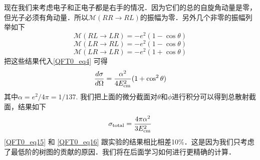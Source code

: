 现在我们来考虑电子和正电子都是右手的情况．因为它们的总的自旋角动量是零，但光子必须有角动量．所以$\mathcal M (RR \rightarrow RL)$的振幅为零．另外几个非零的振幅列举如下
\begin{equation}
\mathcal M(RL\rightarrow LR) = - e^2(1-\cos\theta)  
\end{equation}
\begin{equation}
\mathcal M(LR\rightarrow RL) = - e^2 (1-\cos\theta)
\end{equation}
\begin{equation}
\mathcal M(LR \rightarrow LR) = - e^2(1+\cos\theta)
\end{equation}
把这些结果代入\autoref{QFT0_eq4} 可得
\begin{equation}\label{QFT0_eq15}
\frac{d\sigma}{d\Omega}  = \frac{\alpha^2}{4E_{\rm cm}^2}(1+\cos^2\theta) 
\end{equation} 
其中$\alpha = e^2/4\pi=1/137$. 我们把上面的微分截面对$\theta$和$\phi$进行积分可以得到总散射截面，结果如下
\begin{equation}\label{QFT0_eq16}
\sigma_{\rm total} = \frac{4\pi \alpha^2}{3E_{\rm cm}^2}
\end{equation}
\autoref{QFT0_eq15} 和 \autoref{QFT0_eq16} 跟实验的结果相比相差10\%．这是因为我们只考虑了最低阶的树图的贡献的原因．我们将在后面学习如何进行更精确的计算．





























